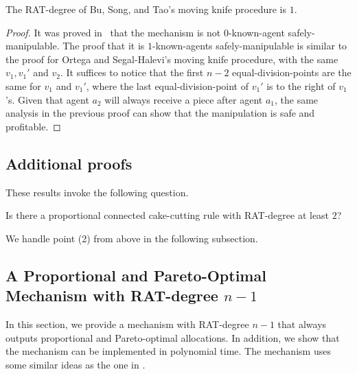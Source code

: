 \begin{toappendix}
\begin{theorem}
    The RAT-degree of Bu, Song, and Tao's moving knife procedure is $1$.
\end{theorem}
\begin{proof}
    It was proved in~\citet{BU2023Rat} that the mechanism is not $0$-known-agent safely-manipulable.
    The proof that it is $1$-known-agents safely-manipulable is similar to the proof for Ortega and Segal-Halevi's moving knife procedure, with the same $v_1,v_1'$ and $v_2$.
    It suffices to notice that the first $n-2$ equal-division-points are the same for $v_1$ and $v_1'$, where the last equal-division-point of $v_1'$ is to the right of $v_1$'s.
    Given that agent $a_2$ will always receive a piece after agent $a_1$, the same analysis in the previous proof can show that the manipulation is safe and profitable. 
\end{proof}

\subsection{Additional proofs} 
\end{toappendix}
These results invoke the following question.
\begin{open}
    Is there a proportional connected cake-cutting rule with RAT-degree at least  $2$?
\end{open}

We handle point (2) from above in the following subsection.

\subsection{A Proportional and Pareto-Optimal Mechanism with RAT-degree $n-1$}
\label{sect:cake-Prop+PO}
In this section, we provide a mechanism with RAT-degree $n-1$ that always outputs proportional and Pareto-optimal allocations.
In addition, we show that the mechanism can be implemented in polynomial time.
The mechanism uses some similar ideas as the one in .


